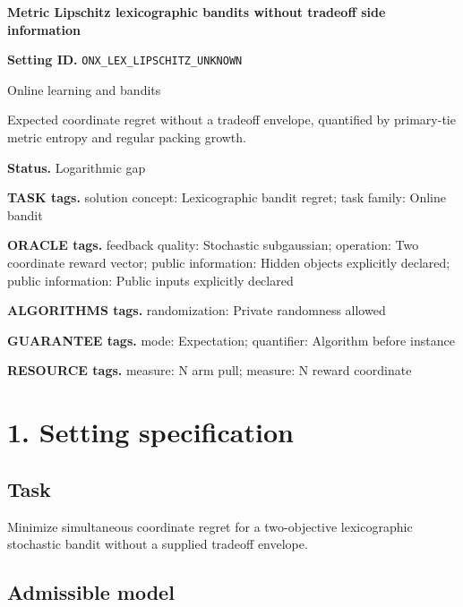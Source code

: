 \documentclass[10pt,a4paper]{article}
\begin{document}
\raggedright

{\LARGE\bfseries\sffamily\color{AtlasNavy} Metric Lipschitz lexicographic bandits without tradeoff side information\par}\vspace{5pt}


\textbf{Setting ID.} \texttt{ONX\_\allowbreak{}LEX\_\allowbreak{}LIPSCHITZ\_\allowbreak{}UNKNOWN}



Online learning and bandits



Expected coordinate regret without a tradeoff envelope, quantified by primary-tie metric entropy and regular packing growth.



\textbf{Status.} Logarithmic gap



\textbf{TASK tags.} solution concept: Lexicographic bandit regret; task family: Online bandit



\textbf{ORACLE tags.} feedback quality: Stochastic subgaussian; operation: Two coordinate reward vector; public information: Hidden objects explicitly declared; public information: Public inputs explicitly declared



\textbf{ALGORITHMS tags.} randomization: Private randomness allowed



\textbf{GUARANTEE tags.} mode: Expectation; quantifier: Algorithm before instance



\textbf{RESOURCE tags.} measure: N arm pull; measure: N reward coordinate



\section{1. Setting specification}


\subsection{Task}


Minimize simultaneous coordinate regret for a two-objective lexicographic stochastic bandit without a supplied tradeoff envelope.



\subsection{Admissible model}
\end{document}
